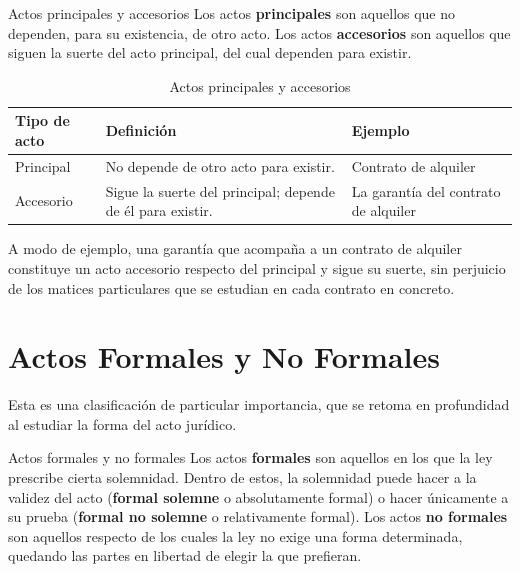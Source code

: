 \documentclass[12pt,oneside]{book}
\begin{document}
\begin{definition}{Actos principales y accesorios}
Los actos \textbf{principales} son aquellos que no dependen, para su existencia, de otro acto. Los actos \textbf{accesorios} son aquellos que siguen la suerte del acto principal, del cual dependen para existir.
\end{definition}

\begin{table}[H]
\centering
\begin{tabularx}{\textwidth}{l X X}
\toprule
\textbf{Tipo de acto} & \textbf{Definición} & \textbf{Ejemplo} \\
\midrule
Principal & No depende de otro acto para existir. & Contrato de alquiler \\
Accesorio & Sigue la suerte del principal; depende de él para existir. & La garantía del contrato de alquiler \\
\bottomrule
\end{tabularx}
\caption{Actos principales y accesorios}
\end{table}

A modo de ejemplo, una garantía que acompaña a un contrato de alquiler constituye un acto accesorio respecto del principal y sigue su suerte, sin perjuicio de los matices particulares que se estudian en cada contrato en concreto.

\section{Actos Formales y No Formales}

Esta es una clasificación de particular importancia, que se retoma en profundidad al estudiar la forma del acto jurídico.

\begin{definition}{Actos formales y no formales}
Los actos \textbf{formales} son aquellos en los que la ley prescribe cierta solemnidad. Dentro de estos, la solemnidad puede hacer a la validez del acto (\textbf{formal solemne} o absolutamente formal) o hacer únicamente a su prueba (\textbf{formal no solemne} o relativamente formal). Los actos \textbf{no formales} son aquellos respecto de los cuales la ley no exige una forma determinada, quedando las partes en libertad de elegir la que prefieran.
\end{definition}
\end{document}
